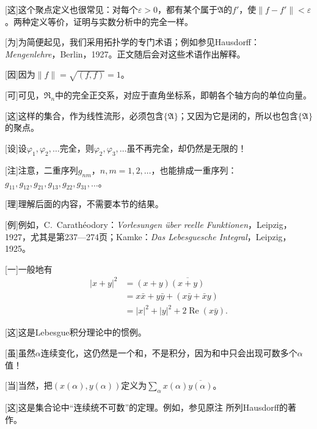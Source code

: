 \documentclass[fontsize=13pt,twoside,openany,headings=normal,parskip=false,bookmarkpackage=false,DIV=calc]{scrbook}
\begin{document}
[这]{这个聚点定义也很常见：对每个$\varepsilon>0$，都有某个属于$\mathfrak A$的$f'$，使$\lVert f-f'\rVert<\varepsilon$。两种定义等价，证明与实数分析中的完全一样。}

[为]{为简便起见，我们采用拓扑学的专门术语；例如参见Hausdorff：\emph{Mengenlehre}，Berlin，1927。正文随后会对这些术语作出解释。}

[因]{因为$\lVert f\rVert=\sqrt{(f,\allowbreak f)}=1$。}

[可]{可见，$\mathfrak R_n$中的完全正交系，对应于直角坐标系，即朝各个轴方向的单位向量。}

[这]{这样的集合，作为线性流形，必须包含$\{\mathfrak A\}$；又因为它是闭的，所以也包含$\{\mathfrak A\}$的聚点。\hypertarget{origpage-242}{}\label{origpage-242}}

[设]{设$\varphi_1,\allowbreak \varphi_2,\allowbreak \ldots$完全，则$\varphi_2,\allowbreak \varphi_3,\allowbreak \ldots$虽不再完全，却仍然是无限的！}

[注]{注意，二重序列$g_{nm}$，$n,\allowbreak m=1,\allowbreak 2,\allowbreak \ldots$，也能排成一重序列：$g_{11},\allowbreak g_{12},\allowbreak g_{21},\allowbreak g_{13},\allowbreak g_{22},\allowbreak g_{31},\allowbreak \ldots$。}

[理]{理解后面的内容，不需要本节的结果。}

[例]{例如，C.~Carathéodory：\emph{Vorlesungen über reelle Funktionen}，Leipzig，1927，尤其是第237—274页；Kamke：\emph{Das Lebesguesche Integral}，Leipzig，1925。}

[一]{一般地有
\begin{align*}
|x+y|^2&=(x+y)\overline{(x+y)}\\
&=x\bar x+y\bar y+(x\bar y+\bar xy)\\
&=|x|^2+|y|^2+2\operatorname{Re}(x\bar y).
\end{align*}}

[这]{这是Lebesgue积分理论中的惯例。}

[虽]{虽然$\alpha$连续变化，这仍然是一个和，不是积分，因为和中只会出现可数多个$\alpha$值！}

[当]{当然，把$(x(\alpha),\allowbreak y(\alpha))$定义为$\sum_\alpha x(\alpha)\overline{y(\alpha)}$。}

[这]{这是集合论中“连续统不可数”的定理。例如，参见原注 \hyperlink{note-45}{} 所列Hausdorff的著作。}
\end{document}

